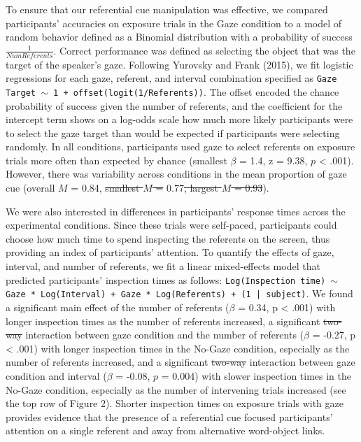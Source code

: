 \documentclass[authoryear, review]{elsarticle}
\providecommand{\DIFaddtex}[1]{{\protect\color{blue}\uwave{#1}}} %
\providecommand{\DIFdeltex}[1]{{\protect\color{red}\sout{#1}}}                      %
\providecommand{\DIFaddbegin}{} %
\providecommand{\DIFaddend}{} %
\providecommand{\DIFdelbegin}{} %
\providecommand{\DIFdelend}{} %
\providecommand{\DIFadd}[1]{\texorpdfstring{\DIFaddtex{#1}}{#1}} %
\providecommand{\DIFdel}[1]{\texorpdfstring{\DIFdeltex{#1}}{}} %
\begin{document}
To ensure that our referential cue manipulation was effective, we
compared participants' accuracies on exposure trials in the Gaze
condition to a model of random behavior defined as a Binomial
distribution with a probability of success \(\frac{1}{Num Referents}\).
Correct performance was defined as selecting the object that was the
target of the speaker's gaze. Following Yurovsky and Frank (2015), we
fit logistic regressions for each gaze, referent, and interval
combination specified as
\texttt{Gaze Target $\sim$ 1 + offset(logit(1/Referents))}. The offset
encoded the chance probability of success given the number of referents,
and the coefficient for the intercept term shows on a log-odds scale how
much more likely participants were to select the gaze target than would
be expected if participants were selecting randomly. In all conditions,
participants used gaze to select referents on exposure trials more often
than expected by chance (smallest \(\beta\) = 1.4, z = 9.38, \(p\)
\textless{} .001). However, there was variability across conditions in
the mean proportion of gaze cue (overall \(M\) = 0.84, \DIFdelbegin \DIFdel{smallest \(M\) =
}\DIFdelend \DIFaddbegin \DIFadd{range:
}\DIFaddend 0.77\DIFdelbegin \DIFdel{, largest \(M\) = 0.93}\DIFdelend \DIFaddbegin \DIFadd{--0.93}\DIFaddend ).

We were also interested in differences in participants' response times
across the experimental conditions. Since these trials were self-paced,
participants could choose how much time to spend inspecting the
referents on the screen, thus providing an index of participants'
attention. To quantify the effects of gaze, interval, and number of
referents, we fit a linear mixed-effects model that predicted
participants' inspection times as follows:
\texttt{Log(Inspection time) $\sim$ Gaze * Log(Interval) + Gaze * Log(Referents) + (1 | subject)}.
We found a significant main effect of the number of referents (\(\beta\)
= 0.34, p \textless{} .001) with longer inspection times as the number
of referents increased, a significant \DIFdelbegin \DIFdel{two-way }\DIFdelend interaction between gaze condition
and the number of referents (\(\beta\) = -0.27, p \textless{} .001) with
longer inspection times in the No-Gaze condition, especially as the
number of referents increased, and a significant \DIFdelbegin \DIFdel{two-way
}\DIFdelend interaction between
gaze condition and interval (\(\beta\) = -0.08, \(p\) = 0.004) with
slower inspection times in the No-Gaze condition, especially as the
number of intervening trials increased (see the top row of Figure 2).
Shorter inspection times on exposure trials with gaze provides evidence
that the presence of a referential cue focused participants' attention
on a single referent and away from alternative word-object links.
\end{document}

